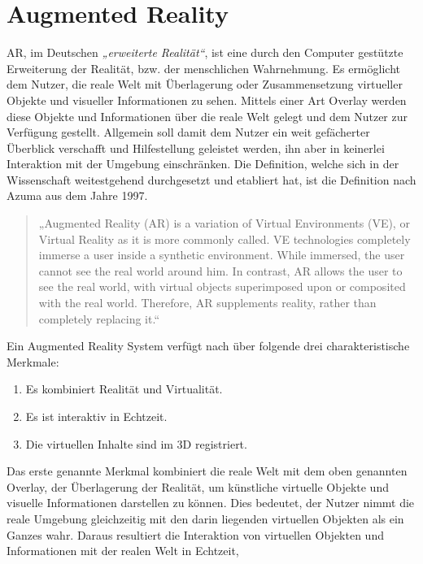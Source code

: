 \section{Augmented Reality}
\label{chap:Augmented Reality}
\acl{AR}, im Deutschen \textit{„erweiterte Realität“}, ist eine durch den Computer gestützte Erweiterung der Realität, bzw. der menschlichen 
Wahrnehmung. Es ermöglicht dem Nutzer, die reale Welt mit Überlagerung oder Zusammensetzung virtueller Objekte und visueller Informationen
zu sehen. Mittels einer Art Overlay werden diese Objekte und Informationen über die reale Welt gelegt und dem Nutzer zur Verfügung gestellt. 
Allgemein soll damit dem Nutzer ein weit gefächerter Überblick verschafft und Hilfestellung geleistet werden, ihn aber in keinerlei 
Interaktion mit der Umgebung einschränken. Die Definition, welche sich in der Wissenschaft weitestgehend durchgesetzt und etabliert hat, ist 
die Definition nach Azuma aus dem Jahre 1997.
\begin{quote}
    „Augmented Reality (AR) is a variation of Virtual Environments (VE), or Virtual Reality as it is more commonly called. VE 
    technologies completely immerse a user inside a synthetic environment. While immersed, the user cannot see the real world around him. 
    In contrast, AR allows the user to see the real world, with virtual objects superimposed upon or composited with the real world. 
    Therefore, AR supplements reality, rather than completely replacing it.“ \cite{azuma.1997a}
\end{quote}
Ein Augmented Reality System verfügt nach \cite{azuma.1997a} über folgende drei charakteristische Merkmale: 
\begin{enumerate}
    \item Es kombiniert Realität und Virtualität.
    \item Es ist interaktiv in Echtzeit.
    \item Die virtuellen Inhalte sind im 3D registriert.
\end{enumerate}
Das erste genannte Merkmal kombiniert die reale Welt mit dem oben genannten Overlay, der Überlagerung der Realität, um künstliche virtuelle 
Objekte und visuelle Informationen darstellen zu können. Dies bedeutet, der Nutzer nimmt die reale Umgebung gleichzeitig mit den darin liegenden virtuellen 
Objekten als ein Ganzes wahr. Daraus resultiert die Interaktion von virtuellen Objekten und Informationen mit der realen Welt in Echtzeit, 
